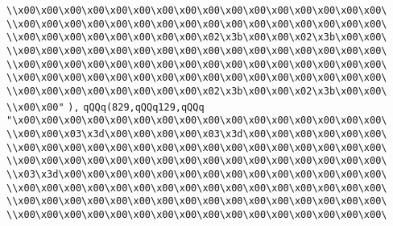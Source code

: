 \verb|\\x00\x00\x00\x00\x00\x00\x00\x00\x00\x00\x00\x00\x00\x00\x00\x00\|\newline
\verb|\\x00\x00\x00\x00\x00\x00\x00\x00\x00\x00\x00\x00\x00\x00\x00\x00\|\newline
\verb|\\x00\x00\x00\x00\x00\x00\x00\x00\x02\x3b\x00\x00\x02\x3b\x00\x00\|\newline
\verb|\\x00\x00\x00\x00\x00\x00\x00\x00\x00\x00\x00\x00\x00\x00\x00\x00\|\newline
\verb|\\x00\x00\x00\x00\x00\x00\x00\x00\x00\x00\x00\x00\x00\x00\x00\x00\|\newline
\verb|\\x00\x00\x00\x00\x00\x00\x00\x00\x00\x00\x00\x00\x00\x00\x00\x00\|\newline
\verb|\\x00\x00\x00\x00\x00\x00\x00\x00\x02\x3b\x00\x00\x02\x3b\x00\x00\|\newline
\verb|\\x00\x00"|\newline
\verb|),|\newline
\verb|qQQq(829,qQQq129,qQQq|\newline
\verb|"\x00\x00\x00\x00\x00\x00\x00\x00\x00\x00\x00\x00\x00\x00\x00\x00\|\newline
\verb|\\x00\x00\x03\x3d\x00\x00\x00\x00\x03\x3d\x00\x00\x00\x00\x00\x00\|\newline
\verb|\\x00\x00\x00\x00\x00\x00\x00\x00\x00\x00\x00\x00\x00\x00\x00\x00\|\newline
\verb|\\x00\x00\x00\x00\x00\x00\x00\x00\x00\x00\x00\x00\x00\x00\x00\x00\|\newline
\verb|\\x03\x3d\x00\x00\x00\x00\x00\x00\x00\x00\x00\x00\x00\x00\x00\x00\|\newline
\verb|\\x00\x00\x00\x00\x00\x00\x00\x00\x00\x00\x00\x00\x00\x00\x00\x00\|\newline
\verb|\\x00\x00\x00\x00\x00\x00\x00\x00\x00\x00\x00\x00\x00\x00\x00\x00\|\newline
\verb|\\x00\x00\x00\x00\x00\x00\x00\x00\x00\x00\x00\x00\x00\x00\x00\x00\|\newline
